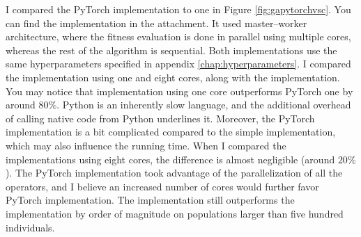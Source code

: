 I compared the PyTorch implementation to \cpp one in Figure \ref{fig:gapytorchvsc}. You can find the \cpp implementation in the attachment. It used master--worker architecture, where the fitness evaluation is done in parallel using multiple cores, whereas the rest of the algorithm is sequential. Both implementations use the same hyperparameters specified in appendix \ref{chap:hyperparameters}. I compared the implementation using one and eight cores, along with the \gpu implementation. You may notice that \cpp implementation using one core outperforms PyTorch one by around $80\%$. Python is an inherently slow language, and the additional overhead of calling native code from Python underlines it. Moreover, the PyTorch implementation is a bit complicated compared to the simple \cpp implementation, which may also influence the running time. When I compared the implementations using eight cores, the difference is almost negligible (around $20\%$). The PyTorch implementation took advantage of the parallelization of all the operators, and I believe an increased number of cores would further favor PyTorch implementation. The \gpu implementation still outperforms the \cpp implementation by order of magnitude on populations larger than five hundred individuals.

